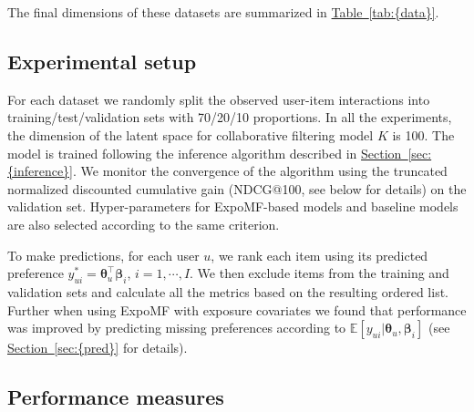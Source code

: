 \documentclass{sig-alternate-arxiv}
\begin{document}
The final dimensions of these datasets are summarized in {\hyperref[tab:{data}]{Table~\ref*{tab:{data}}}}.

\subsection{Experimental setup} 

For each dataset we randomly split the observed user-item interactions
into training/test/validation sets with 70/20/10 proportions. In all the experiments, the dimension 
of the latent space for collaborative filtering model $K$ is 100. The
model is trained following the inference algorithm described in
{\hyperref[sec:{inference}]{Section~\ref*{sec:{inference}}}}. We monitor the convergence of the algorithm using
the truncated normalized discounted cumulative gain ({NDCG@100}, see below for
details) on the validation set. Hyper-parameters for ExpoMF-based models
and baseline models are also selected according to the same criterion.

To make predictions, for each user $u$, we rank each item using its predicted
preference ${y}^*_{ui} = \boldsymbol\theta_u^\top \boldsymbol\beta_i$, $i = 1, \cdots, I$.
We then exclude items from the training and validation sets and calculate all the
metrics based on the resulting ordered list. Further when using
ExpoMF with exposure covariates we found that performance was improved by predicting missing preferences
according to $\mathbb{E}[y_{ui}|\boldsymbol\theta_u,\boldsymbol\beta_i]$ (see {\hyperref[sec:{pred}]{Section~\ref*{sec:{pred}}}} for details).

\subsection{Performance measures}
\end{document}
